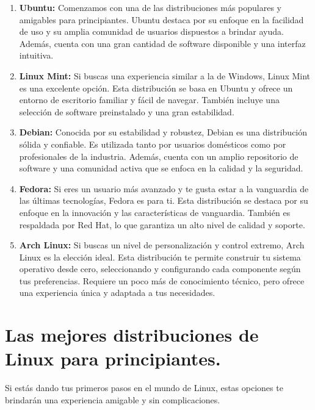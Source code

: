 \documentclass[
  jou,
  floatsintext,
  longtable,
  a4paper,
  nolmodern,
  notxfonts,
  notimes,
  12pt,
  colorlinks=true,linkcolor=blue,citecolor=blue,urlcolor=blue]{apa7}
\begin{document}
\begin{enumerate}
\def\labelenumi{\arabic{enumi}.}
\item
  \textbf{Ubuntu:} Comenzamos con una de las distribuciones más
  populares y amigables para principiantes. Ubuntu destaca por su
  enfoque en la facilidad de uso y su amplia comunidad de usuarios
  dispuestos a brindar ayuda. Además, cuenta con una gran cantidad de
  software disponible y una interfaz intuitiva.
\item
  \textbf{Linux Mint:} Si buscas una experiencia similar a la de
  Windows, Linux Mint es una excelente opción. Esta distribución se basa
  en Ubuntu y ofrece un entorno de escritorio familiar y fácil de
  navegar. También incluye una selección de software preinstalado y una
  gran estabilidad.
\item
  \textbf{Debian:} Conocida por su estabilidad y robustez, Debian es una
  distribución sólida y confiable. Es utilizada tanto por usuarios
  domésticos como por profesionales de la industria. Además, cuenta con
  un amplio repositorio de software y una comunidad activa que se enfoca
  en la calidad y la seguridad.
\item
  \textbf{Fedora:} Si eres un usuario más avanzado y te gusta estar a la
  vanguardia de las últimas tecnologías, Fedora es para ti. Esta
  distribución se destaca por su enfoque en la innovación y las
  características de vanguardia. También es respaldada por Red Hat, lo
  que garantiza un alto nivel de calidad y soporte.
\item
  \textbf{Arch Linux:} Si buscas un nivel de personalización y control
  extremo, Arch Linux es la elección ideal. Esta distribución te permite
  construir tu sistema operativo desde cero, seleccionando y
  configurando cada componente según tus preferencias. Requiere un poco
  más de conocimiento técnico, pero ofrece una experiencia única y
  adaptada a tus necesidades.
\end{enumerate}

\section{Las mejores distribuciones de Linux para
principiantes.}\label{las-mejores-distribuciones-de-linux-para-principiantes.}

Si estás dando tus primeros pasos en el mundo de Linux, estas opciones
te brindarán una experiencia amigable y sin complicaciones.
\end{document}
